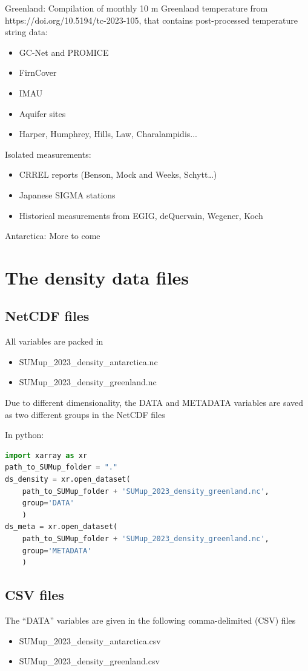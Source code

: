 \documentclass[journal abbreviation, manuscript]{copernicus}
\begin{document}
Greenland:
Compilation of monthly 10 m Greenland temperature from https://doi.org/10.5194/tc-2023-105, that contains post-processed temperature string data:
\begin{itemize}
\item GC-Net and PROMICE 
\item FirnCover
\item IMAU
\item Aquifer sites
\item Harper, Humphrey, Hills, Law, Charalampidis...
\end{itemize}
Isolated measurements:
\begin{itemize}
\item CRREL reports (Benson, Mock and Weeks, Schytt…)
\item Japanese SIGMA stations
\item Historical measurements from EGIG, deQuervain, Wegener, Koch
\end{itemize}

Antarctica:
More to come

\section{The density data files}
\subsection{NetCDF files}

All variables are packed in 
\begin{itemize}
\item SUMup\_2023\_density\_antarctica.nc
\item SUMup\_2023\_density\_greenland.nc
\end{itemize}

Due to different dimensionality, the DATA and METADATA variables are saved as two different groups in the NetCDF files

In python:
\begin{lstlisting}[language=python]
import xarray as xr
path_to_SUMup_folder = "."
ds_density = xr.open_dataset(
    path_to_SUMup_folder + 'SUMup_2023_density_greenland.nc', 
    group='DATA'
    )
ds_meta = xr.open_dataset(
    path_to_SUMup_folder + 'SUMup_2023_density_greenland.nc',
    group='METADATA'
    )
\end{lstlisting} 


\subsection{CSV files}
The “DATA” variables are given in the following comma-delimited (CSV) files 
\begin{itemize}
\item SUMup\_2023\_density\_antarctica.csv 
\item SUMup\_2023\_density\_greenland.csv 
\end{itemize}
\end{document}
